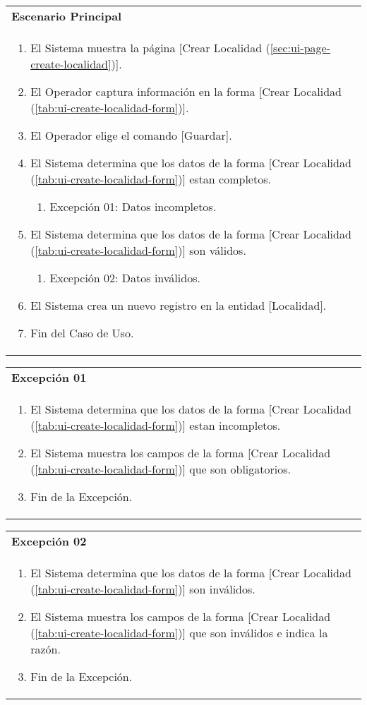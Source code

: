 \begin{tabular}{ p{15.5cm} }
	\textbf{Escenario Principal} \\
	\begin{enumerate}
		\item El Sistema muestra la página [Crear Localidad (\ref{sec:ui-page-create-localidad})].
		\item El Operador captura información en la forma [Crear Localidad (\ref{tab:ui-create-localidad-form})].
		\item El Operador elige el comando [Guardar].
		\item El Sistema determina que los datos de la forma [Crear Localidad (\ref{tab:ui-create-localidad-form})] estan completos.
			\begin{enumerate}
				\item Excepción 01: Datos incompletos.
			\end{enumerate}
		\item El Sistema determina que los datos de la forma [Crear Localidad (\ref{tab:ui-create-localidad-form})] son válidos.
			\begin{enumerate}
				\item Excepción 02: Datos inválidos.
			\end{enumerate}
		\item El Sistema crea un nuevo registro en la entidad [Localidad].
		\item Fin del Caso de Uso.
	\end{enumerate}
\end{tabular}

\begin{tabular}{ p{15.5cm} }
	\textbf{Excepción 01} \\
	\begin{enumerate}
		\item El Sistema determina que los datos de la forma [Crear Localidad (\ref{tab:ui-create-localidad-form})] estan incompletos.
		\item El Sistema muestra los campos de la forma [Crear Localidad (\ref{tab:ui-create-localidad-form})] que son obligatorios.
		\item Fin de la Excepción.
	\end{enumerate}
\end{tabular}

\begin{tabular}{ p{15.5cm} }
	\textbf{Excepción 02} \\
	\begin{enumerate}
		\item El Sistema determina que los datos de la forma [Crear Localidad (\ref{tab:ui-create-localidad-form})] son inválidos.
		\item El Sistema muestra los campos de la forma [Crear Localidad (\ref{tab:ui-create-localidad-form})] que son inválidos e indica la razón.
		\item Fin de la Excepción.
	\end{enumerate}
\end{tabular}


